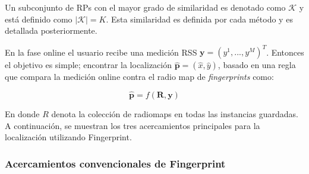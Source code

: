 Un subconjunto de RPs con el mayor grado de similaridad es denotado como \(\mathcal{K}\) y está definido como \(\mathcal{|K|} = K\). Esta similaridad es definida por cada método y es detallada posteriormente.

En la fase online el usuario recibe una medición RSS \quad \(\textbf{y} = (y^{1}, ..., y^{M}) ^{T}\). Entonces el objetivo es simple; encontrar la localización \(\hat{\textbf{p}} = ( \hat{x}, \hat{y})\), basado en una regla que compara la medición online contra el radio map de \textit{fingerprints} como: 

\begin{equation}
\hat{\textbf{p}} = f(\textbf{R}, \textbf{y})
\end{equation}

En donde \(R\) denota la colección de radiomaps en todas las instancias guardadas. A continuación, se muestran los tres acercamientos principales para la localización utilizando Fingerprint.

\subsubsection{Acercamientos convencionales de Fingerprint}

